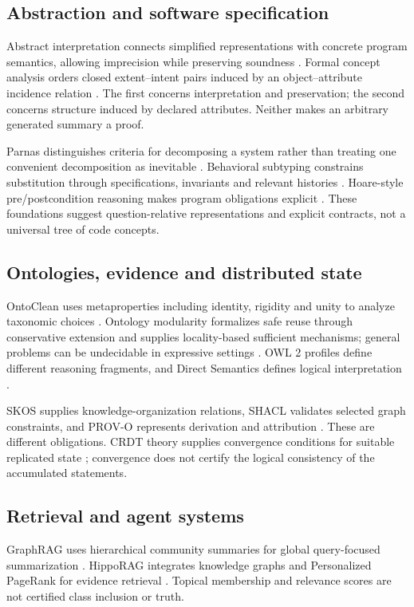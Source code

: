 \documentclass[11pt]{article}
\begin{document}
\subsection{Abstraction and software specification}
Abstract interpretation connects simplified representations with concrete program semantics, allowing imprecision while preserving soundness \citep{cousot1977}. Formal concept analysis orders closed extent--intent pairs induced by an object--attribute incidence relation \citep{ganter1999}. The first concerns interpretation and preservation; the second concerns structure induced by declared attributes. Neither makes an arbitrary generated summary a proof.

Parnas distinguishes criteria for decomposing a system rather than treating one convenient decomposition as inevitable \citep{parnas1972}. Behavioral subtyping constrains substitution through specifications, invariants and relevant histories \citep{liskov1994}. Hoare-style pre/postcondition reasoning makes program obligations explicit \citep{hoare1969}. These foundations suggest question-relative representations and explicit contracts, not a universal tree of code concepts.

\subsection{Ontologies, evidence and distributed state}
OntoClean uses metaproperties including identity, rigidity and unity to analyze taxonomic choices \citep{ontoclean2009}. Ontology modularity formalizes safe reuse through conservative extension and supplies locality-based sufficient mechanisms; general problems can be undecidable in expressive settings \citep{modularity2008}. OWL 2 profiles define different reasoning fragments, and Direct Semantics defines logical interpretation \citep{owl2012,semantics2012}.

SKOS supplies knowledge-organization relations, SHACL validates selected graph constraints, and PROV-O represents derivation and attribution \citep{skos2009,shacl2017,prov2013}. These are different obligations. CRDT theory supplies convergence conditions for suitable replicated state \citep{crdt2011}; convergence does not certify the logical consistency of the accumulated statements.

\subsection{Retrieval and agent systems}
GraphRAG uses hierarchical community summaries for global query-focused summarization \citep{graphrag2024}. HippoRAG integrates knowledge graphs and Personalized PageRank for evidence retrieval \citep{hipporag2024}. Topical membership and relevance scores are not certified class inclusion or truth.
\end{document}
